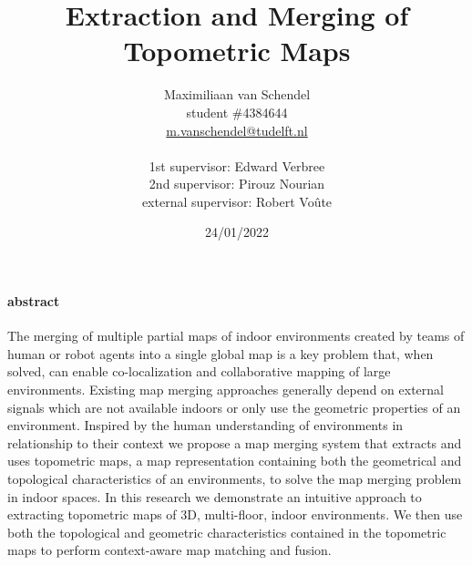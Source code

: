 \documentclass{article}
\title{Extraction and Merging of Topometric Maps}
\author{
  Maximiliaan van Schendel\\
  student \#4384644 \\
  \url{m.vanschendel@tudelft.nl}\\
  \\
  1st supervisor: Edward Verbree \\
  2nd supervisor: Pirouz Nourian \\
  external supervisor: Robert Voûte \\
}
\date{24/01/2022}
\begin{document}

\maketitle
\pagebreak

\tableofcontents
\newpage



\paragraph{abstract}
The merging of multiple partial maps of indoor environments created by teams of human or robot agents into a single global map is a key problem that, when solved, can enable co-localization and collaborative mapping of large environments. Existing map merging approaches generally depend on external signals which are not available indoors or only use the  geometric properties of an environment. Inspired by the human understanding of environments in relationship to their context we propose a map merging system that extracts and uses topometric maps, a map representation containing both the geometrical and topological characteristics of an environments, to solve the map merging problem in indoor spaces. In this research we demonstrate an intuitive approach to extracting topometric maps of 3D, multi-floor, indoor environments. We then use both the topological and geometric characteristics contained in the topometric maps to perform context-aware map matching and fusion. 



\pagebreak

\pagebreak

\pagebreak                                                     

\pagebreak

\pagebreak







\printnoidxglossaries
\end{document}
